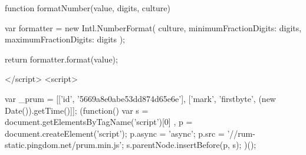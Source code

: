             function formatNumber(value, digits, culture) {
                var formatter = new Intl.NumberFormat(
                    culture, {
                        minimumFractionDigits: digits,
                        maximumFractionDigits: digits
                    });

                return formatter.format(value);
            }

        </script>
<script>

            var _prum = [['id', '5669a8e0abe53dd874d65e6e'],
                         ['mark', 'firstbyte', (new Date()).getTime()]];
            (function() {
                var s = document.getElementsByTagName('script')[0]
                  , p = document.createElement('script');
                p.async = 'async';
                p.src = '//rum-static.pingdom.net/prum.min.js';
                s.parentNode.insertBefore(p, s);
            })();

